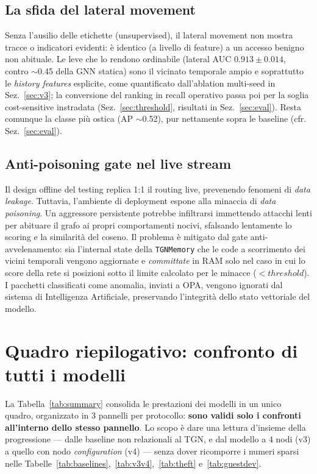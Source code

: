 \subsection{La sfida del lateral movement}

Senza l'ausilio delle etichette (unsupervised), il lateral movement non mostra tracce o indicatori evidenti: è identico (a livello di feature) a un accesso benigno non abituale. Le leve che lo rendono ordinabile (lateral AUC $0.913\pm0.014$, contro $\sim$0.45 della GNN statica) sono il vicinato temporale ampio e soprattutto le \textit{history features} esplicite, come quantificato dall'ablation multi-seed in Sez.~\ref{sec:v3}; la conversione del ranking in recall operativo passa poi per la soglia cost-sensitive instradata (Sez.~\ref{sec:threshold}, risultati in Sez.~\ref{sec:eval}). Resta comunque la classe più ostica (AP $\sim$0.52), pur nettamente sopra le baseline (cfr. Sez.~\ref{sec:eval}).

\subsection{Anti-poisoning gate nel live stream}

Il design offline del testing replica 1:1 il routing live, prevenendo fenomeni di \textit{data leakage}. Tuttavia, l'ambiente di deployment espone alla minaccia di \textit{data poisoning}. Un aggressore persistente potrebbe infiltrarsi immettendo attacchi lenti per abituare il grafo ai propri comportamenti nocivi, sfalsando lentamente lo scoring e la similarità del coseno. Il problema è mitigato dal gate anti-avvelenamento: sia l'internal state della \texttt{TGNMemory} che le code a scorrimento dei vicini temporali vengono aggiornate e \textit{committate} in RAM solo nel caso in cui lo score della rete si posizioni sotto il limite calcolato per le minacce ($< threshold$). I pacchetti classificati come anomalia, inviati a OPA, vengono ignorati dal sistema di Intelligenza Artificiale, preservando l'integrità dello stato vettoriale del modello.

\clearpage
\section{Quadro riepilogativo: confronto di tutti i modelli}
\label{sec:summary}

La Tabella~\ref{tab:summary} consolida le prestazioni dei modelli in un unico quadro, organizzato in 3 pannelli per protocollo: \textbf{sono validi solo i confronti all'interno dello stesso pannello}. Lo scopo è dare una lettura d'insieme della progressione --- dalle baseline non relazionali al TGN, e dal modello a 4 nodi (v3) a quello con nodo \textit{configuration} (v4) --- senza dover ricomporre i numeri sparsi nelle Tabelle~\ref{tab:baselines},~\ref{tab:v3v4},~\ref{tab:theft} e~\ref{tab:guestdev}.

